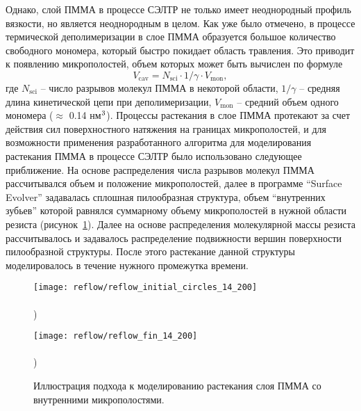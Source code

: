 Однако, слой ПММА в процессе СЭЛТР не только имеет неоднородный профиль вязкости, но является неоднородным в целом.
Как уже было отмечено, в процессе термической деполимеризации в слое ПММА образуется большое количество свободного мономера, который быстро покидает область травления. Это приводит к появлению микрополостей, объем которых может быть вычислен по формуле
\begin{equation}
	V_\mathrm{cav} = N_\mathrm{sci} \cdot 1/\gamma \cdot V_\mathrm{mon},
\end{equation}
где $N_\text{sci}$ -- число разрывов молекул ПММА в некоторой области, $1/\gamma$ -- средняя длина кинетической цепи при деполимеризации, $V_\mathrm{mon}$ -- средний объем одного мономера ($\approx$ 0.14 нм$^\text{3}$). Процессы растекания в слое ПММА протекают за счет действия сил поверхностного натяжения на границах микрополостей, и для возможности применения разработанного алгоритма для моделирования растекания ПММА в процессе СЭЛТР было использовано следующее приближение. На основе распределения числа разрывов молекул ПММА рассчитывался объем и положение микрополостей, далее в программе ``Surface Evolver'' задавалась сплошная пилообразная структура, объем ``внутренних зубьев'' которой равнялся суммарному объему микрополостей в нужной области резиста (рисунок~\ref{fig:reflow_surface}). Далее на основе распределения молекулярной массы резиста рассчитывалось и задавалось распределение подвижности вершин поверхности пилообразной структуры. После этого растекание данной структуры моделировалось в течение нужного промежутка времени.
\begin{figure}[h]
	\begin{minipage}{0.48\textwidth}
		\texttt{[image: reflow/reflow\_initial\_circles\_14\_200]} \\
		\vspace{-28.5ex} \\ ) \\ \vspace{28.5ex}
	\end{minipage}
	\begin{minipage}{0.48\textwidth}
		\texttt{[image: reflow/reflow\_fin\_14\_200]} \\
		\vspace{-28.5ex} \\ ) \\ \vspace{28.5ex}
	\end{minipage}
	\vspace{-3.5em}
	\caption{Иллюстрация подхода к моделированию растекания слоя ПММА со внутренними микрополостями.}
	\label{fig:reflow_surface}
\end{figure}

